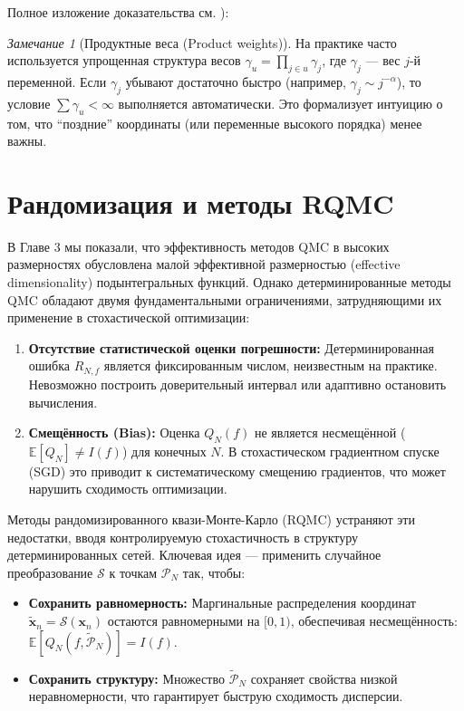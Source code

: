 \documentclass[12pt, a4paper]{article}
\theoremstyle{plain}
\theoremstyle{definition}
\theoremstyle{remark}
\newtheorem{remark}[theorem]{Замечание}
\newcommand{\E}{\mathbb{E}}
\newcommand{\II}{[0, 1)}
\newcommand{\vx}{\boldsymbol{x}}
\newcommand{\PP}{\mathcal{P}}
\begin{document}
Полное изложение доказательства см. \cite{sloan1998quasi}):

\begin{remark}[Продуктные веса (Product weights)]
    На практике часто используется упрощенная структура весов $\gamma_u = \prod_{j \in u} \gamma_j$, где $\gamma_j$ --- вес $j$-й переменной. Если $\gamma_j$ убывают достаточно быстро (например, $\gamma_j \sim j^{-\alpha}$), то условие $\sum \gamma_u < \infty$ выполняется автоматически. Это формализует интуицию о том, что ``поздние'' координаты (или переменные высокого порядка) менее важны.
\end{remark}


\section{Рандомизация и методы RQMC}
\label{sec:rqmc}

В Главе 3 мы показали, что эффективность методов QMC в высоких размерностях обусловлена малой эффективной размерностью (effective dimensionality) подынтегральных функций. Однако детерминированные методы QMC обладают двумя фундаментальными ограничениями, затрудняющими их применение в стохастической оптимизации:

\begin{enumerate}
    \item \textbf{Отсутствие статистической оценки погрешности:} Детерминированная ошибка $R_{N,f}$ является фиксированным числом, неизвестным на практике. Невозможно построить доверительный интервал или адаптивно остановить вычисления.
    \item \textbf{Смещённость (Bias):} Оценка $Q_N(f)$ не является несмещённой ($\E[Q_N] \neq I(f)$) для конечных $N$. В стохастическом градиентном спуске (SGD) это приводит к систематическому смещению градиентов, что может нарушить сходимость оптимизации.
\end{enumerate}

Методы рандомизированного квази-Монте-Карло (RQMC) устраняют эти недостатки, вводя контролируемую стохастичность в структуру детерминированных сетей. Ключевая идея --- применить случайное преобразование $\mathcal{S}$ к точкам $\PP_N$ так, чтобы:
\begin{itemize}
    \item \textbf{Сохранить равномерность:} Маргинальные распределения координат $\widetilde{\vx}_n = \mathcal{S}(\vx_n)$ остаются равномерными на $\II$, обеспечивая несмещённость: $\E[Q_N(f, \widetilde{\PP}_N)] = I(f)$.
    \item \textbf{Сохранить структуру:} Множество $\widetilde{\PP}_N$ сохраняет свойства низкой неравномерности, что гарантирует быструю сходимость дисперсии.
\end{itemize}
\end{document}
